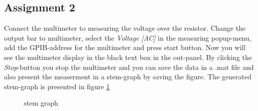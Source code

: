 \subsection{Assignment 2}
Connect the multimeter to measuring the voltage over the resistor. Change the output bar to multimeter, select the \emph{Voltage [AC]} in the measuring popup-menu, add the GPIB-address for the multimeter and press start button. Now you will see the multimeter display in the black text box in the out-panel. By clicking the \emph{Stop}-button you stop the multimeter and you can save the data in a .mat file and also present the measerment in a stem-graph by saving the figure. The generated stem-graph is presented in figure \ref{stem} 
\begin{center}
	\begin{figure}[h]
		\caption{stem graph}
		\label{stem}
	\end{figure}
\end{center}

